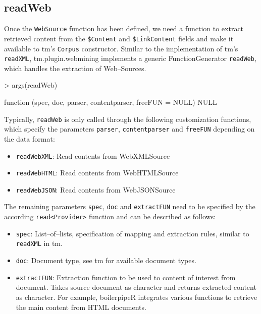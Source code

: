 \documentclass[a4paper]{article}
\let\code=\texttt
\newcommand{\class}[1]{\mbox{\textsf{#1}}}
\newcommand{\pkg}[1]{{\normalfont\fontseries{b}\selectfont #1}}
\newcommand{\proglang}[1]{\textsf{#1}}
\newcommand{\fkt}[1]{\code{#1}}
\newcommand{\field}[1]{\code{\$#1}}
\begin{document}
\subsection{readWeb}
Once the \fkt{WebSource} function has been defined, we need a function to extract retrieved content from
the \field{Content} and \field{LinkContent} fields and make it available to \pkg{tm}'s \fkt{Corpus}
constructor. Similar to the implementation of \pkg{tm}'s \fkt{readXML}, \pkg{tm.plugin.webmining} implements a 
generic \class{FunctionGenerator} \fkt{readWeb}, which handles the extraction of Web--\class{Source}s.

\begin{Schunk}
\begin{Sinput}
> args(readWeb)
\end{Sinput}
\begin{Soutput}
function (spec, doc, parser, contentparser, freeFUN = NULL) 
NULL
\end{Soutput}
\end{Schunk}

Typically, \fkt{readWeb} is only called through the following customization functions, which specify
the parameters \code{parser}, \code{contentparser} and \code{freeFUN} depending on the data format:

\begin{itemize}
\item \fkt{readWebXML}: Read contents from \class{WebXMLSource}
\item \fkt{readWebHTML}: Read contents from \class{WebHTMLSource}
\item \fkt{readWebJSON}: Read contents from \class{WebJSONSource}
\end{itemize}

The remaining parameters \code{spec}, \code{doc} and \code{extractFUN} need to be specified by the
according \fkt{read<Provider>} function and can be described as follows:
\begin{itemize}
\item \code{spec}: List--of--lists, specification of mapping and extraction rules, similar to \fkt{readXML} in \pkg{tm}.
\item \code{doc}: Document type, see \pkg{tm} for available document types.
\item \code{extractFUN}: Extraction function to be used to content of interest from document. Takes source
document as \class{character} and returns extracted content as \class{character}. For example, \pkg{boilerpipeR} 
integrates various functions to retrieve the main content from \proglang{HTML} documents.
\end{itemize}
\end{document}
